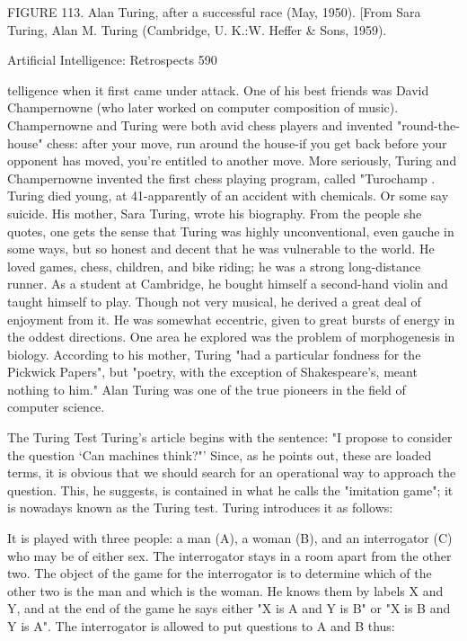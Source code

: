 {                                            FIGURE 113. Alan Turing, after a
                                            successful race (May, 1950). [From
                                            Sara Turing, Alan M. Turing
                                            (Cambridge, U. K.:W. Heffer \& Sons,
                                            1959).




Artificial Intelligence: Retrospects                                              590

telligence when it first came under attack. One of his best friends was David
Champernowne (who later worked on computer composition of music). Champernowne
and Turing were both avid chess players and invented "round-the-house" chess: after
your move, run around the house-if you get back before your opponent has moved, you're
entitled to another move. More seriously, Turing and Champernowne invented the first
chess playing program, called "Turochamp . Turing died young, at 41-apparently of an
accident with chemicals. Or some say suicide. His mother, Sara Turing, wrote his
biography. From the people she quotes, one gets the sense that Turing was highly
unconventional, even gauche in some ways, but so honest and decent that he was
vulnerable to the world. He loved games, chess, children, and bike riding; he was a strong
long-distance runner. As a student at Cambridge, he bought himself a second-hand violin
and taught himself to play. Though not very musical, he derived a great deal of
enjoyment from it. He was somewhat eccentric, given to great bursts of energy in the
oddest directions. One area he explored was the problem of morphogenesis in biology.
According to his mother, Turing "had a particular fondness for the Pickwick Papers", but
"poetry, with the exception of Shakespeare's, meant nothing to him." Alan Turing was
one of the true pioneers in the field of computer science.

                                       The Turing Test
Turing's article begins with the sentence: "I propose to consider the question `Can
machines think?"' Since, as he points out, these are loaded terms, it is obvious that we
should search for an operational way to approach the question. This, he suggests, is
contained in what he calls the "imitation game"; it is nowadays known as the Turing test.
Turing introduces it as follows:

   It is played with three people: a man (A), a woman (B), and an interrogator (C)
   who may be of either sex. The interrogator stays in a room apart from the other
   two. The object of the game for the interrogator is to determine which of the other
   two is the man and which is the woman. He knows them by labels X and Y, and at
   the end of the game he says either "X is A and Y is B" or "X is B and Y is A". The
   interrogator is allowed to put questions to A and B thus:

}

